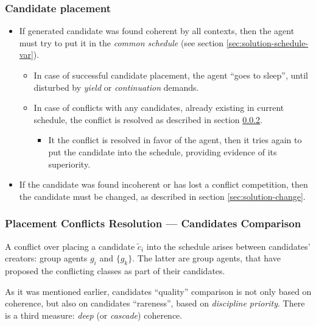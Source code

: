 \documentclass[../../ThesisDoc]{subfiles}
\begin{document}
\subsubsection{Candidate placement}
\begin{itemize}
  \item If generated candidate was found coherent by all contexts,
        then the agent must try to put it in the \emph{common schedule}
        (see section \ref{sec:solution-schedule-var}).
        \begin{itemize}
          \item In case of successful candidate placement, the agent ``goes to sleep'',
                until disturbed by \emph{yield} or \emph{continuation} demands.
          \item In case of conflicts with any candidates, already existing
                in current schedule, the conflict is resolved as described
                in section \ref{sec:solution-compare}.
                \begin{itemize}
                  \item It the conflict is resolved in favor of the agent,
                        then it tries again to put the candidate into the
                        schedule, providing evidence of its superiority.
                \end{itemize}
        \end{itemize}
  \item If the candidate was found incoherent or has lost a conflict competition,
        then the candidate must be changed, as described in section
        \ref{sec:solution-change}.
\end{itemize}



\subsubsection{Placement Conflicts Resolution --- Candidates Comparison}
\label{sec:solution-compare}

A conflict over placing a candidate $\tilde{c}_i$ into the schedule arises
between candidates' creators: group agents $g_i$ and $\{g_k\}$.
The latter are group agents, that have proposed the conflicting classes
as part of their candidates.

As it was mentioned earlier, candidates ``quality'' comparison is not only based
on coherence, but also on candidates ``rareness'', based on \emph{discipline priority}.
There is a third measure: \emph{deep} (or \emph{cascade}) coherence.
\end{document}
